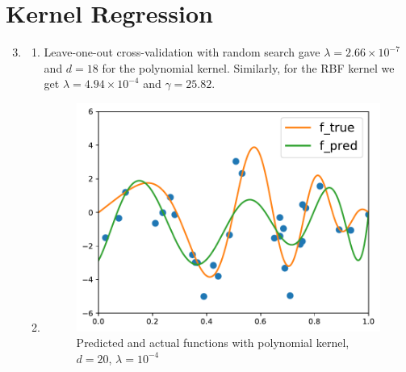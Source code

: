 \documentclass[11pt,letterpaper]{article}
\theoremstyle{definition}
\theoremstyle{plain}
\numberwithin{equation}{section}
\numberwithin{figure}{section}
\begin{document}
\section{Kernel Regression}
\begin{enumerate}
\setcounter{enumi}{2}
	\item \begin{enumerate}
		\item Leave-one-out cross-validation with random search gave $\lambda = 2.66\times10^{-7}$ and $d=18$ for the polynomial kernel. Similarly, for the RBF kernel we get $\lambda = 4.94\times10^{-4}$ and $\gamma = 25.82$.

		\item 

		\begin{figure}[H]
			\centering
			\includegraphics[width=.6\textwidth]{figures/poly_ker_d20_lm4.pdf}
			\caption{Predicted and actual functions with polynomial kernel, $d=20$, $\lambda = 10^{-4}$}
		\end{figure}


\end{enumerate}
\end{enumerate}
\end{document}

